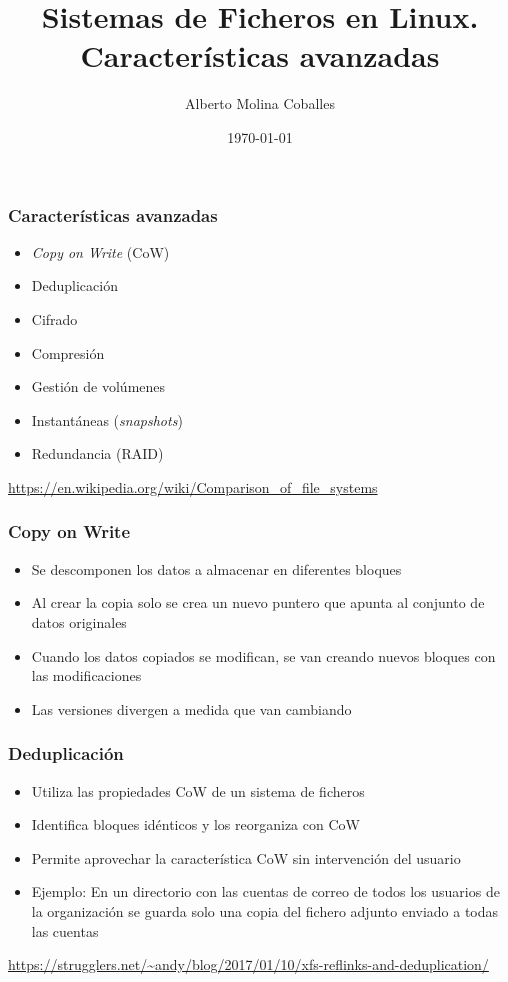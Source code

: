 \documentclass[aspectratio=169]{beamer}
\author{Alberto Molina Coballes}
\title{Sistemas de Ficheros en Linux.\\
  Características avanzadas}
\institute{IES Gonzalo Nazareno}
\date{\today}
\begin{document}
\def\braces#1{[#1]}

\begin{frame}[t,plain]
\titlepage
\end{frame}

\begin{frame}
  \frametitle{Características avanzadas}
  \begin{itemize}
  \item \textit{Copy on Write} (CoW)
  \item Deduplicación
  \item Cifrado
  \item Compresión
  \item Gestión de volúmenes
  \item Instantáneas (\textit{snapshots})
  \item Redundancia (RAID)
  \end{itemize}
  \small{\url{https://en.wikipedia.org/wiki/Comparison_of_file_systems}}
\end{frame}

\begin{frame}
  \frametitle{Copy on Write}
  \begin{itemize}
  \item Se descomponen los datos a almacenar en diferentes bloques
  \item Al crear la copia solo se crea un nuevo puntero que apunta al
    conjunto de datos originales
  \item Cuando los datos copiados se modifican, se van creando nuevos
    bloques con las modificaciones
  \item Las versiones divergen a medida que van cambiando
  \end{itemize}
\end{frame}

\begin{frame}
  \frametitle{Deduplicación}
  \begin{itemize}
  \item Utiliza las propiedades CoW de un sistema de ficheros
  \item Identifica bloques idénticos y los reorganiza con CoW
  \item Permite aprovechar la característica CoW sin intervención del
    usuario
  \item Ejemplo: En un directorio con las cuentas de correo de todos
    los usuarios de la organización se guarda solo una copia del
    fichero adjunto enviado a todas las cuentas
  \end{itemize}
  \small{\url{https://strugglers.net/~andy/blog/2017/01/10/xfs-reflinks-and-deduplication/}}
\end{frame}
\end{document}
